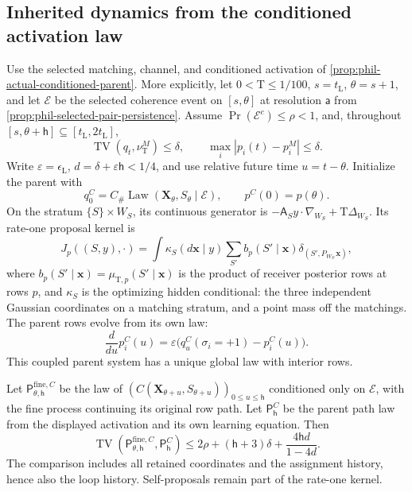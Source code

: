 \subsection*{Inherited dynamics from the conditioned activation law}

Use the selected matching, channel, and conditioned activation of
\cref{prop:phil-actual-conditioned-parent}. More explicitly, let
\(0<\mathrm T\le1/100\), \(s=t_{\mathrm L}\), \(\theta=s+1\), and let \(\mathscr E\)
be the selected coherence event on \([s,\theta]\) at resolution
\(\mathsf a\) from \cref{prop:phil-selected-pair-persistence}.
Assume \(\Pr(\mathscr E^c)\le\rho<1\), and, throughout
\([s,\theta+\mathsf h]\subseteq[t_{\mathrm L},2t_{\mathrm L}]\),
\[
 \operatorname{TV}(q_t,\nu_{\mathrm T}^M)\le\delta,
 \qquad \max_i|p_i(t)-p_i^M|\le\delta.
\]
Write \(\varepsilon=\epsilon_{\mathrm L}\),
\(d=\delta+\varepsilon\mathsf h<1/4\), and use relative future time
\(u=t-\theta\). Initialize the parent with
\[
 q_0^C=C_\#\operatorname{Law}(\mathbf X_\theta,S_\theta\mid\mathscr E),
 \qquad p^C(0)=p(\theta).
\]
On the stratum \(\{S\}\times W_S\), its continuous generator is
\(-\mathsf A_S y\cdot\nabla_{W_S}+\mathrm T\Delta_{W_S}\).
Its rate-one proposal kernel is
\begin{equation}
 J_p((S,y),\cdot)=
 \int\kappa_S(d\mathbf x\mid y)
     \sum_{S'}b_p(S'\mid\mathbf x)
                   \delta_{(S',P_{W_{S'}}\mathbf x)},
 \label{eq:phil-actual-parent-kernel}
\end{equation}
where \(b_p(S'\mid\mathbf x)=\mu_{\mathrm T,p}(S'\mid\mathbf x)\) is the
product of receiver posterior rows at rows \(p\), and
\(\kappa_S\) is the optimizing hidden conditional: the three
independent Gaussian coordinates on a matching stratum, and a point
mass off the matchings. The parent rows evolve from its own law:
\begin{equation}
 \frac d{du}p_i^C(u)
 =\varepsilon\bigl(q_u^C(\sigma_i=+1)-p_i^C(u)\bigr).
 \label{eq:phil-actual-parent-learning}
\end{equation}
This coupled parent system has a unique global law with interior rows.

Let \(\mathsf P_{\theta,\mathsf h}^{\mathrm{fine},C}\) be the law of
\((C(\mathbf X_{\theta+u},S_{\theta+u}))_{0\le u\le\mathsf h}\)
conditioned only on \(\mathscr E\), with the fine process continuing
its original row path. Let \(\mathsf P_{\mathsf h}^C\) be the parent
path law from the displayed activation and its own learning equation.
Then
\begin{equation}
 \operatorname{TV}
 (\mathsf P_{\theta,\mathsf h}^{\mathrm{fine},C},
                                      \mathsf P_{\mathsf h}^C)
 \le2\rho+(\mathsf h+3)\delta+
                         \frac{4\mathsf h d}{1-4d}.
 \label{eq:phil-actual-parent-path-error}
\end{equation}
The comparison includes all retained coordinates and the assignment
history, hence also the loop history. Self-proposals remain part of
the rate-one kernel.

